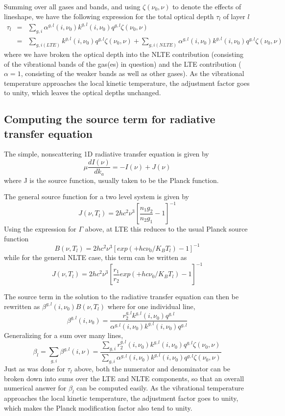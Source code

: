 \documentclass[11pt]{article}
\begin{document}
Summing over all gases and bands, and using $\zeta(\nu_{0},\nu)$ to denote
the effects of lineshape, we have the following expression for the 
total optical depth $\tau_{l}$ of layer $l$
\begin{eqnarray*}
\tau_{l} & = & 
 \sum_{g,i} \alpha^{g,l}(i,\nu_0) k^{g,l}(i,\nu_0) q^{g,l} \zeta(\nu_{0},\nu)\\
   & =  & \sum_{g,i(LTE)} k^{g,l}(i,\nu_0) q^{g,l} \zeta(\nu_{0},\nu) + 
    \sum_{g,i(NLTE)} \alpha^{g,l}(i,\nu_0) k^{g,l}(i,\nu_0) q^{g,l} 
                 \zeta(\nu_{0},\nu)
\end{eqnarray*}
where we have broken the optical depth into the NLTE contribution (consisting 
of the vibrational bands of the gas(es) in question) and the LTE contribution 
($\alpha = 1$, consisting of the weaker bands as well as other gases). 
As the vibrational temperature approaches the local kinetic temperature, the 
adjustment factor goes to unity, which leaves the optical depths unchanged.

\subsection{Computing the source term for radiative transfer equation}

The simple, nonscattering 1D radiative transfer equation is given by
\[
\mu \frac{dI(\nu)}{dk_{a}} = -I(\nu) + J(\nu)
\]
where J is the source function, usually taken to be the Planck function.

The general source function for a two level system is given by 
\cite{edw:93,edw:98,lop:01}
\[
J(\nu,T_{l}) = 2 h c^{2} \nu^{3} [\frac{n_{1}g_{2}}{n_{2}g_{1}} - 1]^{-1}
\]
Using the expression for $\Gamma$ above, at LTE this reduces to the 
usual Planck source function 
\[
B(\nu,T_{l}) = 2 h c^{2} \nu^{3} [exp(+hc\nu_{0}/K_{B}T_{l}) - 1]^{-1}
\]
while for the general NLTE case, this term can be written as
\[
J(\nu,T_{l}) = 
   2 h c^{2} \nu^{3} [\frac{r_{1}}{r_{2}} exp(+hc\nu_{0}/K_{B}T_{l}) - 1]^{-1}
\]

The source term in the solution to the radiative transfer equation can then be
rewritten as \cite{edw:93,edw:98,lop:01,kopra} $\beta^{g,l}(i,\nu_0) 
B(\nu,T_{l})$ where for one individual line, 
\[
\beta^{g,l}(i,\nu_0) = \frac{ r_{2}^{g,l} k^{g,l}(i,\nu_0) q^{g,l}}
 {\alpha^{g,l}(i,\nu_0) k^{g,l}(i,\nu_0) q^{g,l}}
\]
Generalizing for a sum over many lines, 
\[
\beta_{l} = \sum_{g,i} \beta^{g,l}(i,\nu) =  
   \frac{ \sum_{g,i} 
       r_{2}^{g,l}(i,\nu_0) k^{g,l}(i,\nu_0) q^{g,l} \zeta(\nu_{0},\nu) } 
   {\sum_{g,i}  
     \alpha^{g,l}(i,\nu_0) k^{g,l}(i,\nu_0) q^{g,l} \zeta(\nu_{0},\nu)}
\]
Just as was done for $\tau_{l}$ above, both the numerator and denominator can
be broken down into sums over the LTE and NLTE components, so that an overall
numerical answer for $\beta_{l}$ can be computed easily.
As the vibrational temperature approaches the local kinetic temperature, the 
adjustment factor goes to unity, which makes the Planck modification factor 
also tend to unity.
\end{document}
